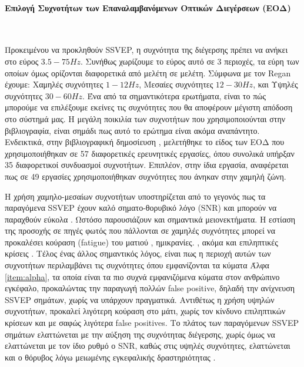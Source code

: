 \documentclass[11pt,a4paper,english,greek,twoside]{../Thesis}
\begin{document}
    \paragraph{Επιλογή Συχνοτήτων των Επαναλαμβανόμενων Οπτικών Διεγέρσεων (ΕΟΔ)} ~\\
      \label{par:freq_choose}
      \par Προκειμένου να προκληθούν SSVEP, η συχνότητα της διέγερσης πρέπει να ανήκει στο εύρος $3.5 - 75Hz$. Συνήθως χωρίζουμε το εύρος αυτό σε 3 περιοχές, τα εύρη των οποίων όμως ορίζονται διαφορετικά από μελέτη σε μελέτη. Σύμφωνα με τον Regan \cite{regan1989human} έχουμε: Χαμηλές συχνότητες $1 - 12Hz$, Μεσαίες συχνότητες $12 - 30Hz$, και Υψηλές συχνότητες $30 - 60Hz$. Ένα από τα σημαντικότερα ερωτήματα, είναι το πώς μπορούμε να επιλέξουμε εκείνες τις συχνότητες που θα αποφέρουν μέγιστη απόδοση στο σύστημά μας. Η μεγάλη ποικιλία των συχνοτήτων που χρησιμοποιούνται στην βιβλιογραφία, είναι σημάδι πως αυτό το ερώτημα είναι ακόμα αναπάντητο. Ενδεικτικά, στην βιβλιογραφική δημοσίευση \cite{zhu2010survey}, μελετήθηκε το είδος των ΕΟΔ που χρησιμοποιήθηκαν σε 57 διαφορετικές ερευνητικές εργασίες, όπου συνολικά υπήρξαν 35 διαφορετικοί συνδυασμοί συχνοτήτων. Επιπλέον, στην ίδια εργασία, αναφέρεται πως σε 49 εργασίες χρησιμοποιήθηκαν συχνότητες που άνηκαν στην χαμηλή ζώνη. 
      \par Η χρήση χαμηλο-μεσαίων συχνοτήτων υποστηρίζεται από το γεγονός πως τα παραγόμενα SSVEP έχουν καλό σηματο-θορυβικό λόγο (SNR) και μπορούν να παραχθούν εύκολα \cite{yijun2005brain}. Ωστόσο παρουσιάζουν και σημαντικά μειονεκτήματα. Η εστίαση της προσοχής σε πηγές φωτός που πάλλονται σε χαμηλές συχνότητες μπορεί να προκαλέσει κούραση (fatigue) του ματιού \cite{lin2012snr}, ημικρανίες. \cite{detommaso1999steady}, ακόμα και επιληπτικές κρίσεις \cite{lin2012snr}. Τέλος ένας άλλος σημαντικός λόγος, είναι πως η περιοχή αυτών των συχνοτήτων περιλαμβάνει τις συχνότητες όπου εμφανίζονται τα κύματα Άλφα \ref{item:alpha}, τα οποία είναι τα πιο συχνά εμφανιζόμενα κύματα στον ανθρώπινο εγκέφαλο, προκαλώντας την παραγωγή πολλών false positive, δηλαδή την ανίχνευση SSVEP σημάτων, χωρίς να υπάρχουν πραγματικά. Αντιθέτως η χρήση υψηλών συχνοτήτων, προκαλεί λιγότερη κούραση στο μάτι, χωρίς τον κίνδυνο επιληπτικών κρίσεων και με σαφώς λιγότερα false positives. Το πλάτος των παραγόμενων SSVEP σημάτων ελαττώνεται με την αύξηση της συχνότητας διέγερσης, χωρίς όμως να ελαττώνεται με τον ίδιο ρυθμό ο SNR, καθώς στις υψηλές συχνότητες, ελαττώνεται και ο θόρυβος λόγω μειωμένης εγκεφαλικής δραστηριότητας \cite{wang2006practical}. 
      
\end{document}
